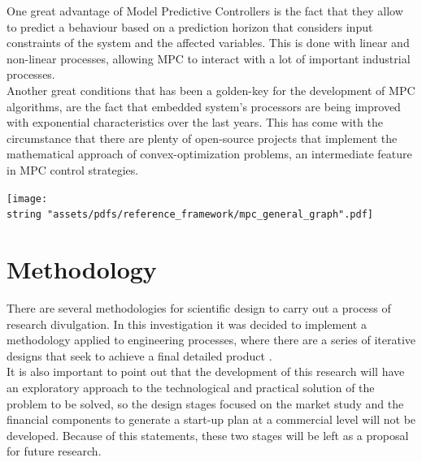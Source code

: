 \documentclass[11pt]{report} %
\begin{document}
One great advantage of Model Predictive Controllers is the fact that they allow to predict a behaviour based on a prediction horizon that considers input constraints of the system and the affected variables. This is done with linear and non-linear processes, allowing MPC to interact with a lot of important industrial processes.\\

Another great conditions that has been a golden-key for the development of MPC algorithms, are the fact that embedded system's processors are being improved with exponential characteristics over the last years. This has come with the circumstance that there are plenty of open-source projects that implement the mathematical approach of convex-optimization problems, an intermediate feature in MPC control strategies.\\


\begin{center}
\texttt{[image: \\string "assets/pdfs/reference\_framework/mpc\_general\_graph".pdf]}
\bigbreak
\begin{minipage}{\linewidth} %
\label{fig_general_mpc_explained_plot_thermal_article}
\end{minipage} \end{center}





\newpage

\chapter{Methodology}

 There are several methodologies for scientific design to carry out a process of research divulgation. In this investigation it was decided to implement a methodology applied to engineering processes, where there are a series of iterative designs that seek to achieve a final detailed product \citep{cite_dieter_engineering_design}.\\
 
It is also important to point out that the development of this research will have an exploratory approach to the technological and practical solution of the problem to be solved, so the design stages focused on the market study and the financial components to generate a start-up plan at a commercial level will not be developed. Because of this statements, these two stages will be left as a proposal for future research.\\
\end{document}
